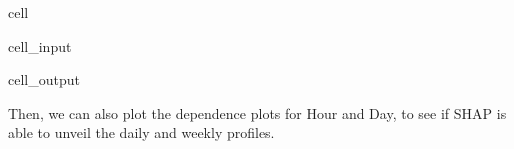 \documentclass[letterpaper,10pt,english]{jupyterBook}
\begin{document}
\begin{sphinxuseclass}{cell}\begin{sphinxVerbatimInput}

\begin{sphinxuseclass}{cell_input}
\begin{sphinxVerbatim}[commandchars=\\\{\}]
   
\end{sphinxVerbatim}

\end{sphinxuseclass}\end{sphinxVerbatimInput}
\begin{sphinxVerbatimOutput}

\begin{sphinxuseclass}{cell_output}
\noindent{}

\end{sphinxuseclass}\end{sphinxVerbatimOutput}

\end{sphinxuseclass}
\sphinxAtStartPar
Then, we can also plot the dependence plots for Hour and Day, to see if SHAP is able to unveil the daily and weekly profiles.
\end{document}
